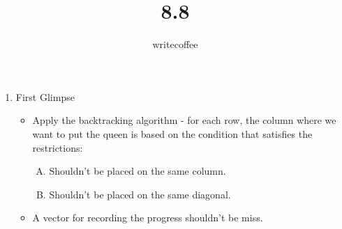 \documentclass[11pt]{article}
\author{writecoffee} \title{8.8}
\begin{document}
\maketitle

{\setlength{\baselineskip}{1\baselineskip}
\setlength{\parindent}{0pt}
\setlength{\parskip}{2ex plus 0.5ex minus 0.2ex}
\begin{enumerate}[1.]
\item
	First Glimpse
	\begin{itemize}
	\item
		Apply the backtracking algorithm - for each row, the column where we want to put the queen is based on the condition that satisfies the restrictions:
		\begin{enumerate}[A.]
		\item
			Shouldn't be placed on the same column.
		\item
			Shouldn't be placed on the same diagonal.
		\end{enumerate}
	\item
		A vector for recording the progress shouldn't be miss.
	\end{itemize}
\end{enumerate}
\par}
%
%
\end{document}
